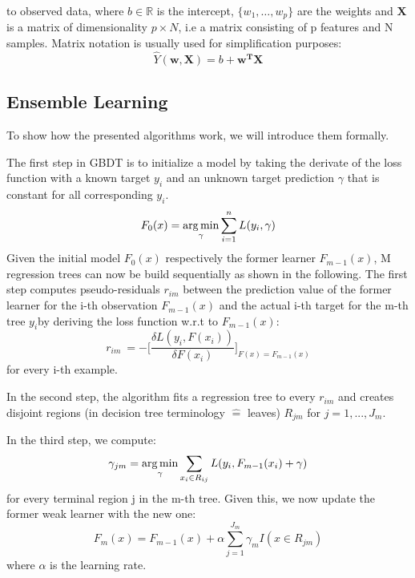 to observed data, where $b \in \mathbb{R}$ is the intercept, $\{w_1, \dots, w_p\}$ are the weights and $\mathbf{X}$ is a matrix of dimensionality $p \times N$, i.e a matrix consisting of p features and N samples. Matrix notation is usually used for simplification purposes: 
\begin{equation}
	\hat Y(\mathbf{w},\mathbf{X}) = b + \mathbf{w^T}\mathbf{X}
\end{equation}

\subsection{Ensemble Learning}

To show how the presented algorithms work, we will introduce them formally.

The first step in GBDT is to initialize a model by taking the derivate of the loss function with a known target $ y_i $ and an unknown target prediction $ \gamma $ that is constant for all corresponding $ y_i $.
\begin{equation}
F_{0}(x) =  \operatorname*{arg\,min}_{\gamma} \sum_{i=1}^n L(y_i,\gamma) \label{gbdt_step1}
\end{equation}
Given the initial model $ F_0(x) $ respectively the former learner $ F_{m-1}(x) $, M regression trees can now be build sequentially as shown in the following. 
The first step computes pseudo-residuals $ r_{im} $ between the prediction value of the former learner for the i-th observation $ F_{m-1}(x) $ and the actual i-th target for the m-th tree $ y_i $by deriving the loss function w.r.t to $ F_{m-1}(x) $: 
\begin{equation}
	r_{im}\ = - \bigg[\dfrac{\delta L(y_i, F(x_i))}{\delta F(x_i)}\bigg]_{F(x) = F_{m-1}(x)}
\end{equation} 
for every i-th example.

In the second step, the algorithm fits a regression tree to every $ r_{im} $ and creates disjoint regions (in decision tree terminology $\widehat{=}$ \glqq leaves\grqq) $ R_{jm} $ for $j = 1, ..., J_m$. 

In the third step, we compute: 
\begin{equation}
	\gamma_{jm} = \operatorname*{arg\,min}_{\gamma} \sum_{x_i \in R_{ij}} L(y_i, F_{m-1}(x_i) + \gamma)
\end{equation}
for every terminal region j in the m-th tree. 
Given this, we now update the former weak learner with the new one:
\begin{equation}
	F_m(x) = F_{m-1}(x) + \alpha \sum_{j=1}^{J_m} \gamma_{m}I(x \in R_{jm})
\end{equation}
where $ \alpha $ is the learning rate.

